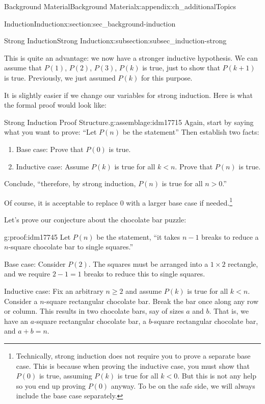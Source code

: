 \documentclass[oneside,10pt,]{book}
\numberwithin{equation}{chapter}
\newcommand{\lt}{<}
\newcommand{\gt}{>}
\begin{document}
\begin{appendixptx}{Background Material}{}{Background Material}{}{}{x:appendix:ch_additionalTopics}
\begin{sectionptx}{Induction}{}{Induction}{}{}{x:section:sec_background-induction}
\begin{subsectionptx}{Strong Induction}{}{Strong Induction}{}{}{x:subsection:subsec_induction-strong}
\par
This is quite an advantage: we now have a stronger inductive hypothesis. We can assume that \(P(1)\), \(P(2)\), \(P(3)\), \textellipsis{} \(P(k)\) is true, just to show that \(P(k+1)\) is true. Previously, we just assumed \(P(k)\) for this purpose.%
\par
It is slightly easier if we change our variables for strong induction. Here is what the formal proof would look like:%
\begin{assemblage}{Strong Induction Proof Structure.}{g:assemblage:idm17715}%
Again, start by saying what you want to prove: ``Let \(P(n)\) be the statement\textellipsis{}'' Then establish two facts:%
\begin{enumerate}
\item{}Base case: Prove that \(P(0)\) is true.%
\item{}Inductive case: Assume \(P(k)\) is true for all \(k \lt  n\). Prove that \(P(n)\) is true.%
\end{enumerate}
Conclude, ``therefore, by strong induction, \(P(n)\) is true for all \(n \gt 0\).''%
\end{assemblage}
Of course, it is acceptable to replace 0 with a larger base case if needed.\footnote{Technically, strong induction does not require you to prove a separate base case. This is because when proving the inductive case, you must show that \(P(0)\) is true, assuming \(P(k)\) is true for all \(k \lt  0\). But this is not any help so you end up proving \(P(0)\) anyway. To be on the safe side, we will always include the base case separately.\label{g:fn:idm17739}}%
\par
Let's prove our conjecture about the chocolate bar puzzle:%
\begin{proofptx}{}{g:proof:idm17745}
Let \(P(n)\) be the statement, ``it takes \(n-1\) breaks to reduce a \(n\)-square chocolate bar to single squares.''%
\par
Base case: Consider \(P(2)\). The squares must be arranged into a \(1\times 2\) rectangle, and we require \(2-1 = 1\) breaks to reduce this to single squares.%
\par
Inductive case: Fix an arbitrary \(n\ge 2\) and assume \(P(k)\) is true for all \(k \lt n\).  Consider a \(n\)-square rectangular chocolate bar.  Break the bar once along any row or column.  This results in two chocolate bars, say of sizes \(a\) and \(b\).  That is, we have an \(a\)-square rectangular chocolate bar, a \(b\)-square rectangular chocolate bar, and \(a+b = n\).%
\par

\end{proofptx}
\end{subsectionptx}
\end{sectionptx}
\end{appendixptx}
\end{document}
